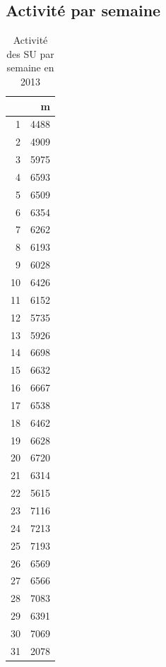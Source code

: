 \documentclass[12pt,english,french,twoside]{report}\usepackage[]{graphicx}\usepackage[]{color}
\begin{document}
\subsection*{Activité par semaine}

\begin{table}[ht]
\centering
\begin{tabular}{rr}
  \hline
 & m \\ 
  \hline
1 & 4488 \\ 
  2 & 4909 \\ 
  3 & 5975 \\ 
  4 & 6593 \\ 
  5 & 6509 \\ 
  6 & 6354 \\ 
  7 & 6262 \\ 
  8 & 6193 \\ 
  9 & 6028 \\ 
  10 & 6426 \\ 
  11 & 6152 \\ 
  12 & 5735 \\ 
  13 & 5926 \\ 
  14 & 6698 \\ 
  15 & 6632 \\ 
  16 & 6667 \\ 
  17 & 6538 \\ 
  18 & 6462 \\ 
  19 & 6628 \\ 
  20 & 6720 \\ 
  21 & 6314 \\ 
  22 & 5615 \\ 
  23 & 7116 \\ 
  24 & 7213 \\ 
  25 & 7193 \\ 
  26 & 6569 \\ 
  27 & 6566 \\ 
  28 & 7083 \\ 
  29 & 6391 \\ 
  30 & 7069 \\ 
  31 & 2078 \\ 
   \hline
\end{tabular}
\caption[Activité par semaine]{Activité des SU par semaine en 2013} 
\label{act_sem}
\end{table}
\end{document}
